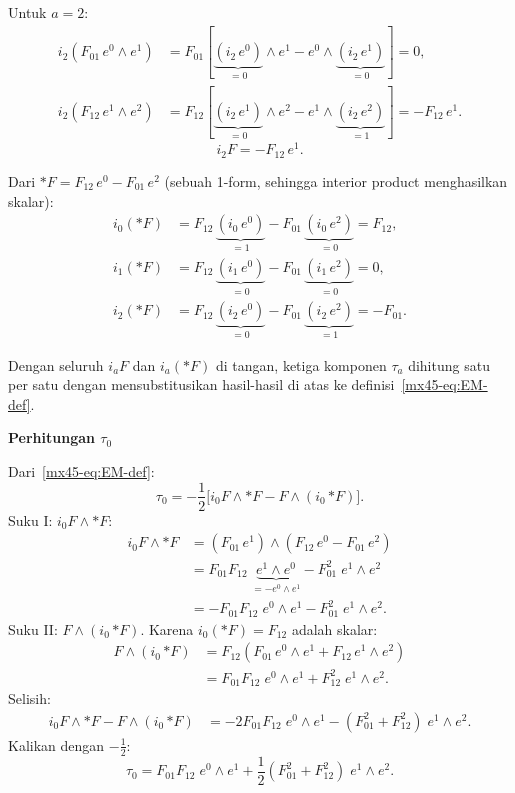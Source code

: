 \noindent Untuk $a = 2$:
\begin{align}
    i_2(F_{01}\,e^0 \wedge e^1) &= F_{01}\!\left[\underbrace{(i_2\,e^0)}_{=0}\wedge e^1 - e^0 \wedge\underbrace{(i_2\,e^1)}_{=0}\right] = 0, \\[4pt]
    i_2(F_{12}\,e^1 \wedge e^2) &= F_{12}\!\left[\underbrace{(i_2\,e^1)}_{=0}\wedge e^2 - e^1 \wedge\underbrace{(i_2\,e^2)}_{=1}\right] = -F_{12}\,e^1.
\end{align}
\begin{equation}
    i_2 F = -F_{12}\,e^1.
\end{equation}

Dari ${*F} = F_{12}\,e^0 - F_{01}\,e^2$ (sebuah 1-form, sehingga interior product menghasilkan skalar):
\begin{align}
    i_0({*F}) &= F_{12}\,\underbrace{(i_0\,e^0)}_{=1} - F_{01}\,\underbrace{(i_0\,e^2)}_{=0} = F_{12}, \\[4pt]
    i_1({*F}) &= F_{12}\,\underbrace{(i_1\,e^0)}_{=0} - F_{01}\,\underbrace{(i_1\,e^2)}_{=0} = 0, \\[4pt]
    i_2({*F}) &= F_{12}\,\underbrace{(i_2\,e^0)}_{=0} - F_{01}\,\underbrace{(i_2\,e^2)}_{=1} = -F_{01}.
\end{align}

Dengan seluruh $i_a F$ dan $i_a(*F)$ di tangan, ketiga komponen $\tau_a$ dihitung satu per satu dengan mensubstitusikan hasil-hasil di atas ke definisi~\eqref{mx45-eq:EM-def}.

\vspace{0.5em}
\noindent \textbf{Perhitungan $\tau_0$}

Dari~\eqref{mx45-eq:EM-def}:
\begin{equation}
    \tau_0 = -\frac{1}{2}\Big[i_0 F \wedge {*F} - F \wedge (i_0\,{*F})\Big].
\end{equation}
Suku I: $i_0 F \wedge {*F}$:
\begin{align}
    i_0 F \wedge {*F} &= (F_{01}\,e^1) \wedge (F_{12}\,e^0 - F_{01}\,e^2) \nonumber\\[4pt]
    &= F_{01}F_{12}\;\underbrace{e^1 \wedge e^0}_{= -e^0 \wedge e^1} - F_{01}^2\;e^1 \wedge e^2 \nonumber\\[4pt]
    &= -F_{01}F_{12}\;e^0 \wedge e^1 - F_{01}^2\;e^1 \wedge e^2.
\end{align}
Suku II: $F \wedge (i_0\,{*F})$. Karena $i_0({*F}) = F_{12}$ adalah skalar:
\begin{align}
    F \wedge (i_0\,{*F}) &= F_{12}\!\left(F_{01}\,e^0 \wedge e^1 + F_{12}\,e^1 \wedge e^2\right) \nonumber\\[4pt]
    &= F_{01}F_{12}\;e^0 \wedge e^1 + F_{12}^2\;e^1 \wedge e^2.
\end{align}
Selisih:
\begin{align}
    i_0 F \wedge {*F} - F \wedge (i_0\,{*F}) &= -2F_{01}F_{12}\;e^0 \wedge e^1 - (F_{01}^2 + F_{12}^2)\;e^1 \wedge e^2.
\end{align}
Kalikan dengan $-\frac{1}{2}$:
\begin{equation}
    \tau_0 = F_{01}F_{12}\;e^0 \wedge e^1 + \frac{1}{2}(F_{01}^2 + F_{12}^2)\;e^1 \wedge e^2. \label{mx45-eq:tau0}
\end{equation}

